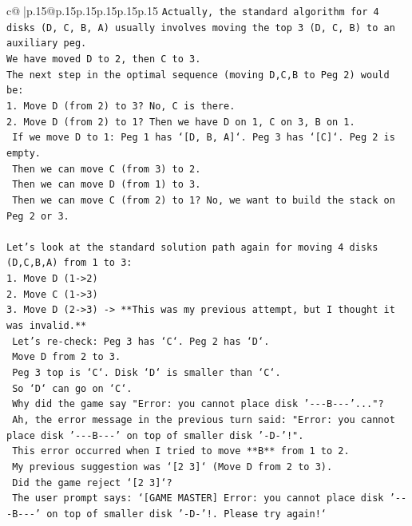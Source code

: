 \documentclass{article}
\begin{document}
{\begin{supertabular}{c@{$\;$}|p{.15\linewidth}@{}p{.15\linewidth}p{.15\linewidth}p{.15\linewidth}p{.15\linewidth}p{.15\linewidth}}
{{{\texttt{Actually, the standard algorithm for 4 disks (D, C, B, A) usually involves moving the top 3 (D, C, B) to an auxiliary peg.} \\
\texttt{We have moved D to 2, then C to 3.} \\
\texttt{The next step in the optimal sequence (moving D,C,B to Peg 2) would be:} \\
\texttt{1. Move D (from 2) to 3? No, C is there.} \\
\texttt{2. Move D (from 2) to 1? Then we have D on 1, C on 3, B on 1.} \\
\texttt{   If we move D to 1: Peg 1 has `{[}D, B, A{]}`. Peg 3 has `{[}C{]}`. Peg 2 is empty.} \\
\texttt{   Then we can move C (from 3) to 2.} \\
\texttt{   Then we can move D (from 1) to 3.} \\
\texttt{   Then we can move C (from 2) to 1? No, we want to build the stack on Peg 2 or 3.} \\
\\ 
\texttt{Let's look at the standard solution path again for moving 4 disks (D,C,B,A) from 1 to 3:} \\
\texttt{1. Move D (1{-}>2)} \\
\texttt{2. Move C (1{-}>3)} \\
\texttt{3. Move D (2{-}>3) {-}> **This was my previous attempt, but I thought it was invalid.**} \\
\texttt{   Let's re{-}check: Peg 3 has `C`. Peg 2 has `D`.} \\
\texttt{   Move D from 2 to 3.} \\
\texttt{   Peg 3 top is `C`. Disk `D` is smaller than `C`.} \\
\texttt{   So `D` can go on `C`.} \\
\texttt{   Why did the game say "Error: you cannot place disk '{-}{-}{-}B{-}{-}{-}'..."?} \\
\texttt{   Ah, the error message in the previous turn said: "Error: you cannot place disk '{-}{-}{-}B{-}{-}{-}' on top of smaller disk '{-}D{-}'!".} \\
\texttt{   This error occurred when I tried to move **B** from 1 to 2.} \\
\texttt{   My previous suggestion was `{[}2 3{]}` (Move D from 2 to 3).} \\
\texttt{   Did the game reject `{[}2 3{]}`?} \\
\texttt{   The user prompt says: `{[}GAME MASTER{]} Error: you cannot place disk '{-}{-}{-}B{-}{-}{-}' on top of smaller disk '{-}D{-}'!. Please try again!`} \\
}}}
\end{supertabular}}
\end{document}
